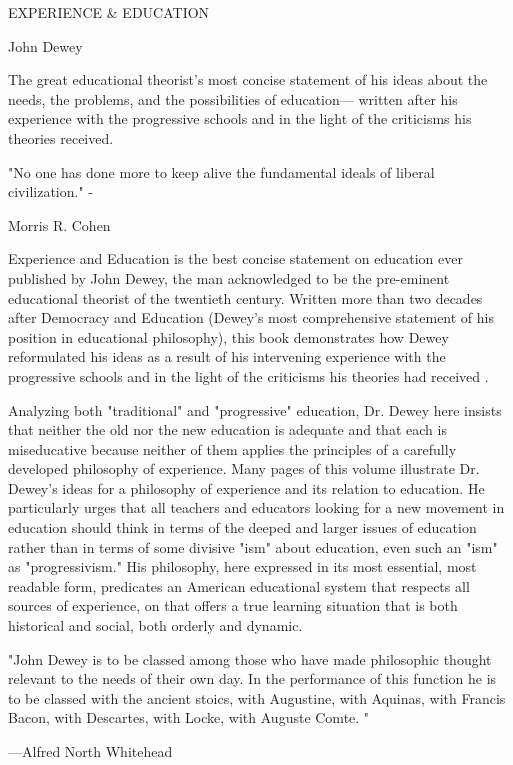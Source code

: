 EXPERIENCE & EDUCATION 

John Dewey 


The great educational theorist's most concise statement of his ideas about the needs, 
the problems, and the possibilities of education— written after his experience with the 
progressive schools and in the light of the criticisms his theories received. 

"No one has done more to keep alive the fundamental ideals of liberal civilization." - 

Morris R. Cohen 

Experience and Education is the best concise statement on education ever published 
by John Dewey, the man acknowledged to be the pre-eminent educational theorist of the 
twentieth century. Written more than two decades after Democracy and Education 
(Dewey's most comprehensive statement of his position in educational philosophy), this 
book demonstrates how Dewey reformulated his ideas as a result of his intervening 
experience with the progressive schools and in the light of the criticisms his theories had 
received . 

Analyzing both "traditional" and "progressive" education, Dr. Dewey here insists that 
neither the old nor the new education is adequate and that each is miseducative because 
neither of them applies the principles of a carefully developed philosophy of experience. 
Many pages of this volume illustrate Dr. Dewey's ideas for a philosophy of experience 
and its relation to education. He particularly urges that all teachers and educators looking 
for a new movement in education should think in terms of the deeped and larger issues of 
education rather than in terms of some divisive "ism" about education, even such an 
"ism" as "progressivism." His philosophy, here expressed in its most essential, most 
readable form, predicates an American educational system that respects all sources of 
experience, on that offers a true learning situation that is both historical and social, both 
orderly and dynamic. 

"John Dewey is to be classed among those who have made philosophic thought 
relevant to the needs of their own day. In the performance of this function he is to be 
classed with the ancient stoics, with Augustine, with Aquinas, with Francis Bacon, with 
Descartes, with Locke, with Auguste Comte. " 


—Alfred North Whitehead 

